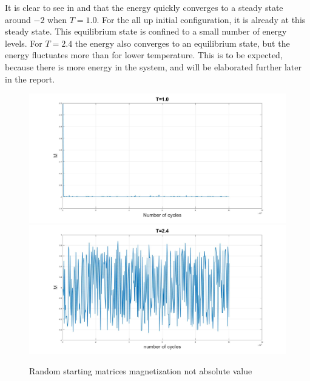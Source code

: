 \documentclass[10pt,a4paper]{article}
\begin{document}
\noindent It is clear to see in  and  that the energy quickly converges to a steady state around $-2$ when $T=1.0$. For the all up initial configuration, it is already at this steady state. This equilibrium state is confined to a small number of energy levels. For $T=2.4$ the energy also converges to an equilibrium state, but the energy fluctuates more than for lower temperature. This is to be expected, because there is more energy in the system, and will be elaborated further later in the report. 

\begin{figure} [H]
\centerline{
\includegraphics[scale=0.15]{RANDOMmag1notabs.jpg}
\includegraphics[scale=0.15]{RANDOMmag24notabs.jpg}
}
\caption{Random starting matrices magnetization not absolute value}
\label{fig:RandomMagNotAbs}
\end{figure}
\end{document}
